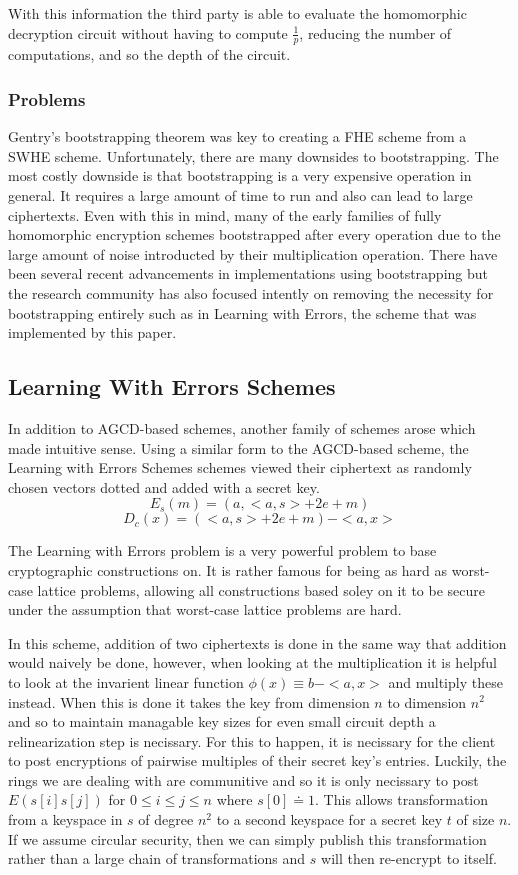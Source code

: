 \documentclass[letterpaper,twocolumn,10pt]{article}
\begin{document}
With this information the third party is able to evaluate the homomorphic decryption circuit without having to compute $\frac{1}{p}$, reducing the number of computations, and so the depth of the circuit.

\subsubsection{Problems}
Gentry's bootstrapping theorem was key to creating a FHE scheme from a SWHE scheme. Unfortunately, there are many downsides to bootstrapping. The most costly downside is that bootstrapping is a very expensive operation in general. It requires a large amount of time to run\cite{ImplementingGentry} and also can lead to large ciphertexts\cite{NEEDED}. Even with this in mind, many of the early families of fully homomorphic encryption schemes bootstrapped after every operation due to the large amount of noise introducted by their multiplication operation\cite{NEEDED}. There have been several recent advancements in implementations using bootstrapping\cite{StehleSteinfeld, SmartVercuteren, ImplementingGentry, CNT} but the research community has also focused intently on removing the necessity for bootstrapping entirely such as in Learning with Errors, the scheme that was implemented by this paper.

\subsection{Learning With Errors Schemes}
In addition to AGCD-based schemes, another family of schemes arose which made intuitive sense. Using a similar form to the AGCD-based scheme, the Learning with Errors Schemes\cite{SansBootstrapping} schemes viewed their ciphertext as randomly chosen vectors dotted and added with a secret key.
$$E_s(m) = (a, <a,s> + 2e + m)$$
$$D_c(x) = (<a,s> + 2e + m) - <a,x>$$

The Learning with Errors problem is a very powerful problem to base cryptographic constructions on. It is rather famous for being as hard as worst-case lattice problems, allowing all constructions based soley on it to be secure under the assumption that worst-case lattice problems are hard.

In this scheme, addition of two ciphertexts is done in the same way that addition would naively be done, however, when looking at the multiplication it is helpful to look at the invarient linear function $\phi(x) \equiv b - <a,x>$ and multiply these instead. When this is done it takes the key from dimension $n$ to dimension $n^2$ and so to maintain managable key sizes for even small circuit depth a relinearization step is necissary. For this to happen, it is necissary for the client to post encryptions of pairwise multiples of their secret key's entries. Luckily, the rings we are dealing with are communitive and so it is only necissary to post $E(s[i]s[j])$ for $0 \leq i \leq j \leq n$ where $s[0] \doteq 1$. This allows transformation from a keyspace in $s$ of degree $n^2$ to a second keyspace for a secret key $t$ of size $n$. If we assume circular security, then we can simply publish this transformation rather than a large chain of transformations and $s$ will then re-encrypt to itself.
\end{document}
